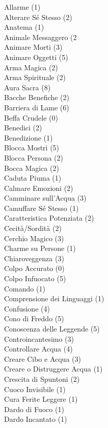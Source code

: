 \begin{multicols}{3}
{	Allarme (1)\\
	Alterare Sé Stesso (2)\\
	Anatema (1)\\
	Animale Messaggero (2\\
	Animare Morti (3)\\
	Animare Oggetti (5)\\
	Arma Magica (2)\\
	Arma Spirituale (2)\\
	Aura Sacra (8)\\
	Bacche Benefiche (2)\\
	Barriera di Lame (6)\\
	Beffa Crudele (0)\\
	Benedici (2)\\
	Benedizione (1)\\
	Blocca Mostri (5)\\
	Blocca Persona (2)\\
	Bocca Magica (2)\\
	Caduta Piuma (1)\\
	Calmare Emozioni (2)\\
	Camminare sull'Acqua (3)\\
	Camuffare Sé Stesso (1)\\
	Caratteristica Potenziata (2)\\
	Cecità/Sordità (2)\\
	Cerchio Magico (3)\\
	Charme su Persone (1)\\
	Chiaroveggenza (3)\\
	Colpo Accurato (0)\\
	Colpo Infuocato (5)\\
	Comando (1)\\
	Comprensione dei Linguaggi (1)\\
	Confusione (4)\\
	Cono di Freddo (5)\\
	Conoscenza delle Leggende (5)\\
	Controincantesimo (3)\\
	Controllare Acqua (4)\\
	Creare Cibo e Acqua (3)\\
	Creare o Distruggere Acqua (1)\\
	Crescita di Spuntoni (2)\\
	Cuoco Invisibile (1)\\
	Cura Ferite Leggere (1)\\
	Dardo di Fuoco (1)\\
	Dardo Incantato (1)\\
}
\end{multicols}
